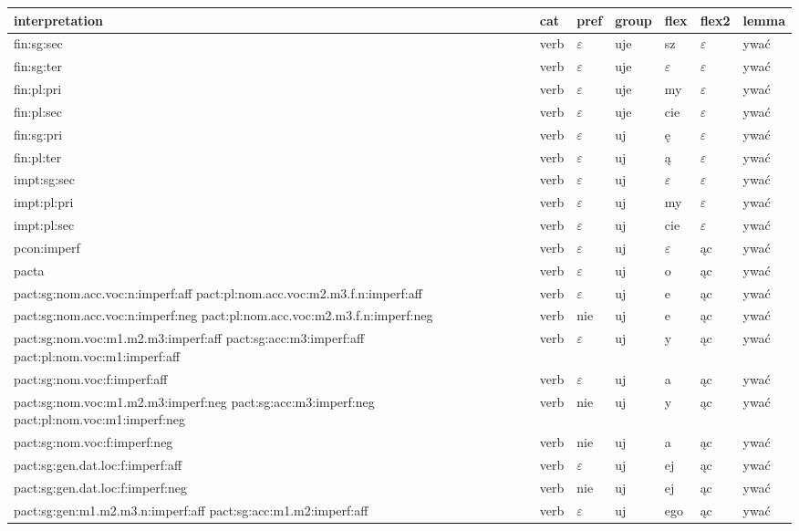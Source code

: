 \documentclass{article}
\begin{document}
\begin{longtable}{p{7cm}|l|l|l|l|l|l}
interpretation & cat & pref & group & flex & flex2 & lemma\\
\hline
fin:sg:sec & verb & $\varepsilon$ & uje & sz & $\varepsilon$ & ywać\\
fin:sg:ter & verb & $\varepsilon$ & uje & $\varepsilon$ & $\varepsilon$ & ywać\\
fin:pl:pri & verb & $\varepsilon$ & uje & my & $\varepsilon$ & ywać\\
fin:pl:sec & verb & $\varepsilon$ & uje & cie & $\varepsilon$ & ywać\\
fin:sg:pri & verb & $\varepsilon$ & uj & ę & $\varepsilon$ & ywać\\
fin:pl:ter & verb & $\varepsilon$ & uj & ą & $\varepsilon$ & ywać\\
impt:sg:sec & verb & $\varepsilon$ & uj & $\varepsilon$ & $\varepsilon$ & ywać\\
impt:pl:pri & verb & $\varepsilon$ & uj & my & $\varepsilon$ & ywać\\
impt:pl:sec & verb & $\varepsilon$ & uj & cie & $\varepsilon$ & ywać\\
pcon:imperf & verb & $\varepsilon$ & uj & $\varepsilon$ & ąc & ywać\\
pacta & verb & $\varepsilon$ & uj & o & ąc & ywać\\
pact:sg:nom.acc.voc:n:imperf:aff pact:pl:nom.acc.voc:m2.m3.f.n:imperf:aff & verb & $\varepsilon$ & uj & e & ąc & ywać\\
pact:sg:nom.acc.voc:n:imperf:neg pact:pl:nom.acc.voc:m2.m3.f.n:imperf:neg & verb & nie & uj & e & ąc & ywać\\
pact:sg:nom.voc:m1.m2.m3:imperf:aff pact:sg:acc:m3:imperf:aff pact:pl:nom.voc:m1:imperf:aff & verb & $\varepsilon$ & uj & y & ąc & ywać\\
pact:sg:nom.voc:f:imperf:aff & verb & $\varepsilon$ & uj & a & ąc & ywać\\
pact:sg:nom.voc:m1.m2.m3:imperf:neg pact:sg:acc:m3:imperf:neg pact:pl:nom.voc:m1:imperf:neg & verb & nie & uj & y & ąc & ywać\\
pact:sg:nom.voc:f:imperf:neg & verb & nie & uj & a & ąc & ywać\\
pact:sg:gen.dat.loc:f:imperf:aff & verb & $\varepsilon$ & uj & ej & ąc & ywać\\
pact:sg:gen.dat.loc:f:imperf:neg & verb & nie & uj & ej & ąc & ywać\\
pact:sg:gen:m1.m2.m3.n:imperf:aff pact:sg:acc:m1.m2:imperf:aff & verb & $\varepsilon$ & uj & ego & ąc & ywać\\

\end{longtable}
\end{document}

